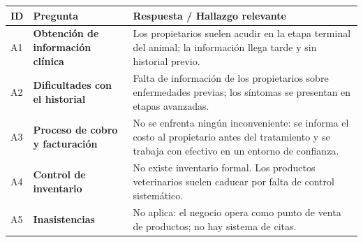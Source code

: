 \documentclass[
]{article}
\newcounter{none} %
\begin{document}
{\def\LTcaptype{none} %
\begin{longtable}[]{@{}
  >{\centering\arraybackslash}p{}
  >{\raggedright\arraybackslash}p{}
  >{\raggedright\arraybackslash}p{}@{}}
\toprule\noalign{}
\begin{minipage}[b]{\linewidth}\centering
\textbf{ID}
\end{minipage} & \begin{minipage}[b]{\linewidth}\centering
\textbf{Pregunta}
\end{minipage} & \begin{minipage}[b]{\linewidth}\raggedright
\textbf{Respuesta / Hallazgo relevante}
\end{minipage} \\
\midrule\noalign{}
\endhead
\bottomrule\noalign{}
\endlastfoot
A1 & \textbf{Obtención de información clínica} &
\begin{minipage}[t]{\linewidth}\raggedright
Los propietarios suelen acudir en la etapa terminal del animal; la
información llega tarde y sin historial previo.
\end{minipage} \\
A2 & \textbf{Dificultades con el historial} &
\begin{minipage}[t]{\linewidth}\raggedright
Falta de información de los propietarios sobre enfermedades previas; los
síntomas se presentan en etapas avanzadas.
\end{minipage} \\
A3 & \textbf{Proceso de cobro y facturación} &
\begin{minipage}[t]{\linewidth}\raggedright
No se enfrenta ningún inconveniente: se informa el costo al propietario
antes del tratamiento y se trabaja con efectivo en un entorno de
confianza.
\end{minipage} \\
A4 & \textbf{Control de inventario} &
\begin{minipage}[t]{\linewidth}\raggedright
No existe inventario formal. Los productos veterinarios suelen caducar
por falta de control sistemático.
\end{minipage} \\
A5 & \textbf{Inasistencias} &
\begin{minipage}[t]{\linewidth}\raggedright
No aplica: el negocio opera como punto de venta de productos; no hay
sistema de citas.
\end{minipage} \\
\end{longtable}
}
\end{document}
